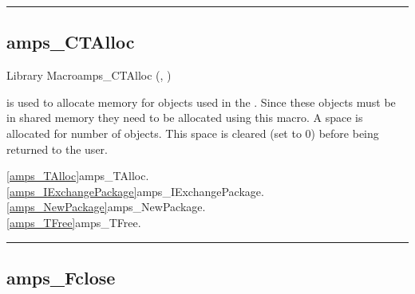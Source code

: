 
\noindent\rule{\textwidth}{1mm}

\subsection{amps\_CTAlloc}
\label{amps_CTAlloc}


\begin{deftypefn}{Library Macro}{}{amps\_CTAlloc}
(, )

\DESCRIPTION

 is used to allocate memory for objects used
in the .  Since these objects must be in
shared memory they need to be allocated using this macro.
A space is allocated for  number of  objects.
This space is cleared (set to 0) before being returned to the user.

\SEEALSO
\vref{amps_TAlloc}{amps\_TAlloc}. \\
\vref{amps_IExchangePackage}{amps\_IExchangePackage}. \\
\vref{amps_NewPackage}{amps\_NewPackage}. \\
\vref{amps_TFree}{amps\_TFree}. \\

\end{deftypefn}


\noindent\rule{\textwidth}{1mm}

\subsection{amps\_Fclose}
\label{amps_Fclose}


